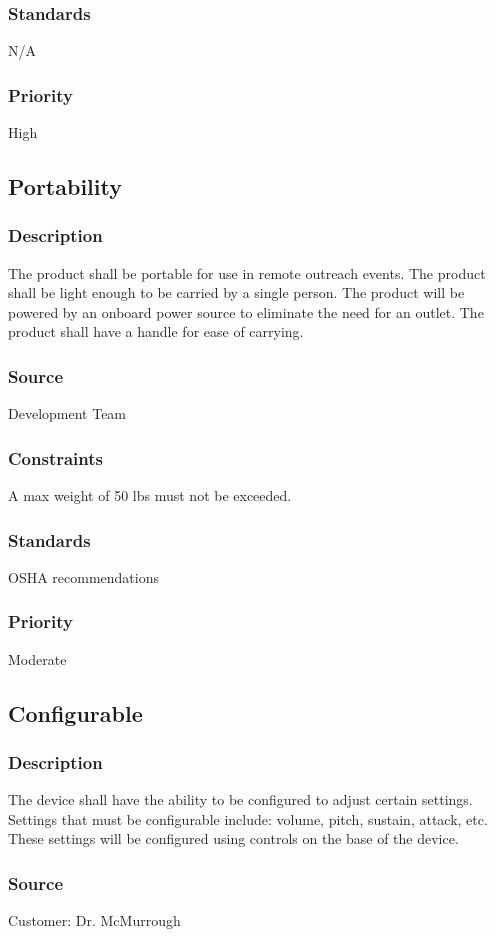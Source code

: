 \subsubsection{Standards}
N/A
\subsubsection{Priority}
High

\subsection{Portability}
\subsubsection{Description}
The product shall be portable for use in remote outreach events. The product shall be light enough to be carried by a single person. The product will be powered by an onboard power source to eliminate the need for an outlet. The product shall have a handle for ease of carrying. 
\subsubsection{Source}
Development Team
\subsubsection{Constraints}
A max weight of 50 lbs must not be exceeded. 
\subsubsection{Standards}
OSHA recommendations 
\subsubsection{Priority}
Moderate

\subsection{Configurable}
\subsubsection{Description}
The device shall have the ability to be configured to adjust certain settings. Settings that must be configurable include: volume, pitch, sustain, attack, etc. These settings will be configured using controls on the base of the device. 
\subsubsection{Source}
Customer: Dr. McMurrough
